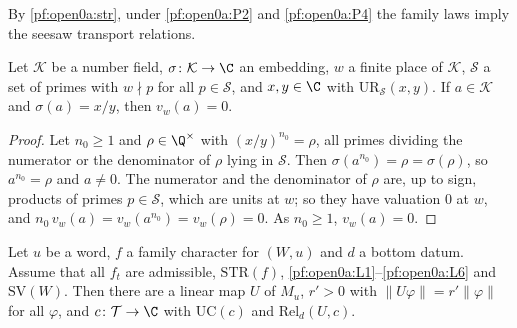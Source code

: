 By \cref{pf:open0a:str}, under \ref{pf:open0a:P2} and \ref{pf:open0a:P4} the family laws imply the seesaw transport
relations.

\begin{lemma}\label{pf:open0a:vw}
Let $\mathcal{K}$ be a number field, $\sigma\colon\mathcal{K}\to\C$ an embedding, $w$ a finite place of $\mathcal{K}$,
$\mathcal S$ a set of primes with $w\nmid p$ for all $p\in\mathcal S$, and $x,y\in\C$ with $\mathrm{UR}_{\mathcal S}(x,y)$.
If $a\in\mathcal{K}$ and $\sigma(a)=x/y$, then $v_w(a)=0$.
\
\end{lemma}

\begin{proof}
Let $n_0\ge1$ and $\rho\in\Q^\times$ with $(x/y)^{n_0}=\rho$, all primes dividing the numerator or the denominator of
$\rho$ lying in $\mathcal S$. Then $\sigma(a^{n_0})=\rho=\sigma(\rho)$, so $a^{n_0}=\rho$ and $a\ne0$. The numerator and
the denominator of $\rho$ are, up to sign, products of primes $p\in\mathcal S$, which are units at $w$; so they have
valuation $0$ at $w$, and $n_0\,v_w(a)=v_w(a^{n_0})=v_w(\rho)=0$. As $n_0\ge1$, $v_w(a)=0$.
\end{proof}

\begin{lemma}\label{pf:open0a:rellinks}
Let $u$ be a word, $f$ a family character for $(W,u)$ and $d$ a bottom datum. Assume that all $f_t$ are admissible,
$\mathrm{STR}(f)$, \ref{pf:open0a:L1}--\ref{pf:open0a:L6} and $\mathrm{SV}(W)$. Then there are a linear map $U$ of
$M_u$, $r'>0$ with $\|U\varphi\|=r'\|\varphi\|$ for all $\varphi$, and $c\colon\mathcal T\to\C$ with $\mathrm{UC}(c)$
and $\mathrm{Rel}_d(U,c)$.
\end{lemma}

